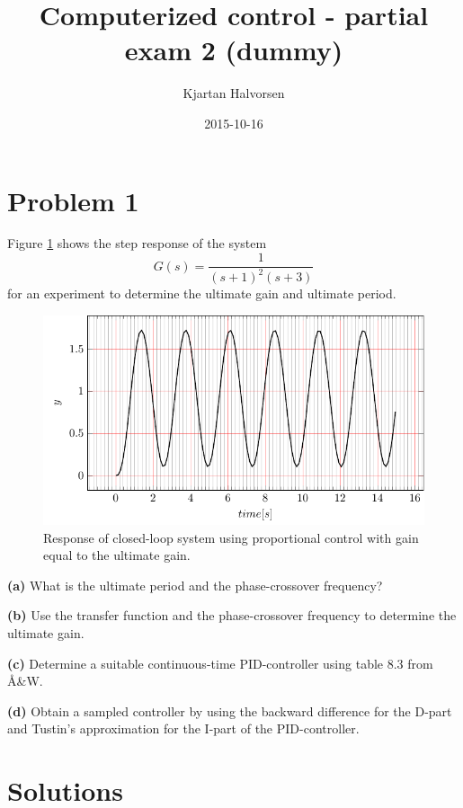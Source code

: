 \documentclass{scrartcl}
\title{Computerized control - partial exam 2 (dummy)}
\author{Kjartan Halvorsen}
\date{2015-10-16}
\begin{document}
\maketitle





\section*{Problem 1}
\label{sec-1}

Figure \ref{fig:step} shows the step response of the system 
\[ G(s) = \frac{1}{(s+1)^2(s+3)} \]
for an experiment to determine the ultimate gain and ultimate period.
\begin{figure}
\begin{center}
\includegraphics[]{ultimate_gain_experiment}
\caption{Response of closed-loop system using proportional control with gain equal to the ultimate gain.}
\label{fig:step}  
\end{center}
\end{figure}

  \textbf{(a)} What is the ultimate period and the phase-crossover frequency?

  \textbf{(b)} Use the transfer function and the phase-crossover frequency to determine the ultimate gain.

  \textbf{(c)} Determine a suitable continuous-time PID-controller using table 8.3 from Å\&W.

  \textbf{(d)} Obtain a sampled controller by using the backward difference for the D-part and Tustin's approximation for the I-part of the PID-controller.
\section*{Solutions}
\label{sec-2}
\end{document}
